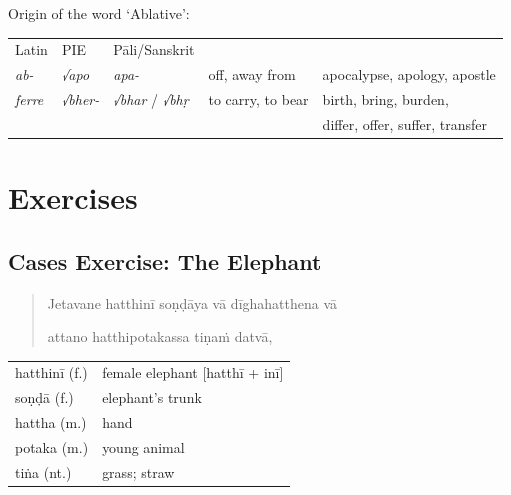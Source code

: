 \documentclass[11pt,oneside]{memoir}
\begin{document}
Origin of the word `Ablative':

\begin{center}
\begin{tabular}{lllll}
Latin & PIE & Pāli/Sanskrit &  & \\[0pt]
\emph{ab-} & \emph{√apo} & \emph{apa-} & off, away from & apocalypse, apology, apostle\\[0pt]
\emph{ferre} & \emph{√bher-} & \emph{√bhar} / \emph{√bhṛ} & to carry, to bear & birth, bring, burden,\\[0pt]
 &  &  &  & differ, offer, suffer, transfer\\[0pt]
\end{tabular}
\end{center}

\clearpage

\section{Exercises}
\label{sec:org3d33e13}
\subsection{Cases Exercise: The Elephant}
\label{sec:org6b9ab33}

\casesLegendHeaderBGHere

\begin{quote}
Jetavane hatthinī soṇḍāya vā dīghahatthena vā

attano hatthipotakassa tiṇaṁ datvā,
\end{quote}

\bigskip

\begin{longtable}{L{\colOne} L{\colTwo}}
hatthinī (f.) & female elephant [hatthī + inī]\\[0pt]
soṇḍā (f.) & elephant's trunk\\[0pt]
hattha (m.) & hand\\[0pt]
potaka (m.) & young animal\\[0pt]
tiṅa (nt.) & grass; straw\\[0pt]
\end{longtable}

\renewcommand{\arraystretch}{1.6}
\end{document}
